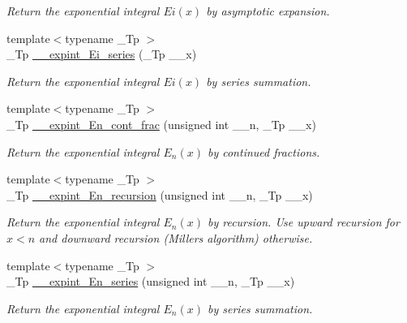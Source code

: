 \begin{DoxyCompactItemize}
\begin{DoxyCompactList}\small\item\em Return the exponential integral $ Ei(x) $ by asymptotic expansion. \end{DoxyCompactList}\item 
{\footnotesize template$<$typename \+\_\+\+Tp $>$ }\\\+\_\+\+Tp \hyperlink{namespacestd_1_1____detail_a7582d1305e84e0263cc6ec2a00a2bf7d}{\+\_\+\+\_\+expint\+\_\+\+Ei\+\_\+series} (\+\_\+\+Tp \+\_\+\+\_\+x)
\begin{DoxyCompactList}\small\item\em Return the exponential integral $ Ei(x) $ by series summation. \end{DoxyCompactList}\item 
{\footnotesize template$<$typename \+\_\+\+Tp $>$ }\\\+\_\+\+Tp \hyperlink{namespacestd_1_1____detail_a34e1eb1248cdad9ceed2aa33732de6ea}{\+\_\+\+\_\+expint\+\_\+\+En\+\_\+cont\+\_\+frac} (unsigned int \+\_\+\+\_\+n, \+\_\+\+Tp \+\_\+\+\_\+x)
\begin{DoxyCompactList}\small\item\em Return the exponential integral $ E_n(x) $ by continued fractions. \end{DoxyCompactList}\item 
{\footnotesize template$<$typename \+\_\+\+Tp $>$ }\\\+\_\+\+Tp \hyperlink{namespacestd_1_1____detail_a9b0a2050324390fb6c4a584170289a99}{\+\_\+\+\_\+expint\+\_\+\+En\+\_\+recursion} (unsigned int \+\_\+\+\_\+n, \+\_\+\+Tp \+\_\+\+\_\+x)
\begin{DoxyCompactList}\small\item\em Return the exponential integral $ E_n(x) $ by recursion. Use upward recursion for $ x < n $ and downward recursion (Miller\textquotesingle{}s algorithm) otherwise. \end{DoxyCompactList}\item 
{\footnotesize template$<$typename \+\_\+\+Tp $>$ }\\\+\_\+\+Tp \hyperlink{namespacestd_1_1____detail_a5c51269e411cd82ffec2e63212f76b41}{\+\_\+\+\_\+expint\+\_\+\+En\+\_\+series} (unsigned int \+\_\+\+\_\+n, \+\_\+\+Tp \+\_\+\+\_\+x)
\begin{DoxyCompactList}\small\item\em Return the exponential integral $ E_n(x) $ by series summation. \end{DoxyCompactList}\item 

\end{DoxyCompactItemize}
